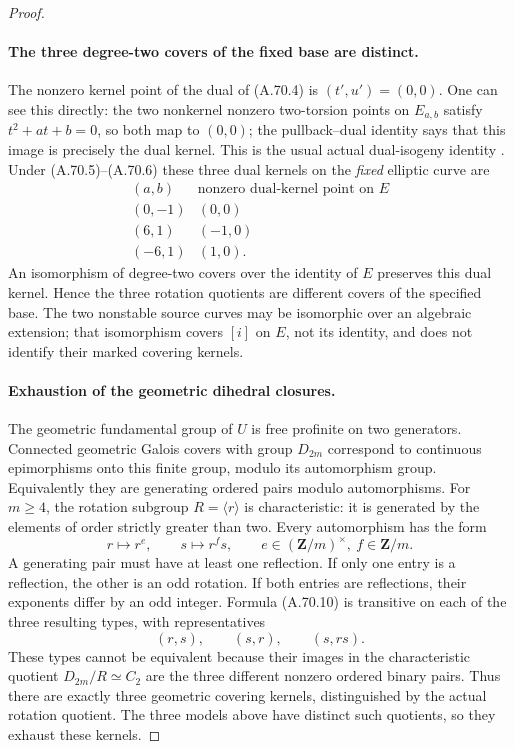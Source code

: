 \begin{proof}
\paragraph{The three degree-two covers of the fixed base are distinct.}
The nonzero kernel point of the dual of (A.70.4) is \((t',u')=(0,0)\).
One can see this directly: the two nonkernel nonzero two-torsion
points on \(E_{a,b}\) satisfy \(t^2+at+b=0\), so both map
to \((0,0)\); the pullback--dual identity says that this image
is precisely the dual kernel. This is the usual actual dual-isogeny
identity \cite[III.6.1--6.2]{fghSilvermanAEC}.
Under (A.70.5)--(A.70.6) these
three dual kernels on the \emph{fixed} elliptic curve are
\[
 \begin{array}{c|c}
 (a,b)&\text{nonzero dual-kernel point on }E\\ \hline
 (0,-1)&(0,0)\\
 (6,1)&(-1,0)\\
 (-6,1)&(1,0).
 \end{array}                                                   \tag{A.70.9}
\]
An isomorphism of degree-two covers over the identity of \(E\)
preserves this dual kernel. Hence the three rotation quotients
are different covers of the specified base. The two nonstable
source curves may be isomorphic over an algebraic extension;
that isomorphism covers \([i]\) on \(E\), not its identity,
and does not identify their marked covering kernels.

\paragraph{Exhaustion of the geometric dihedral closures.}
The geometric fundamental group of \(U\) is free profinite on
two generators. Connected geometric Galois covers with group
\(D_{2m}\) correspond to continuous epimorphisms onto this
finite group, modulo its automorphism group. Equivalently they
are generating ordered pairs modulo automorphisms.
For \(m\ge4\), the rotation subgroup \(R=\langle r\rangle\)
is characteristic: it is generated by the elements of order
strictly greater than two. Every automorphism has the form
\[
       r\longmapsto r^e,\qquad s\longmapsto r^f s,
       \qquad e\in(\mathbf Z/m)^\times,\ f\in\mathbf Z/m.
                                                               \tag{A.70.10}
\]
A generating pair must have at least one reflection. If only
one entry is a reflection, the other is an odd rotation. If
both entries are reflections, their exponents differ by an
odd integer. Formula (A.70.10) is transitive on each of the
three resulting types, with representatives
\[
                      (r,s),\qquad(s,r),\qquad(s,rs).
                                                               \tag{A.70.11}
\]
These types cannot be equivalent because their images in the
characteristic quotient \(D_{2m}/R\simeq C_2\) are the three
different nonzero ordered binary pairs. Thus there are exactly
three geometric covering kernels, distinguished by the actual
rotation quotient. The three models above have distinct such
quotients, so they exhaust these kernels.


\end{proof}
